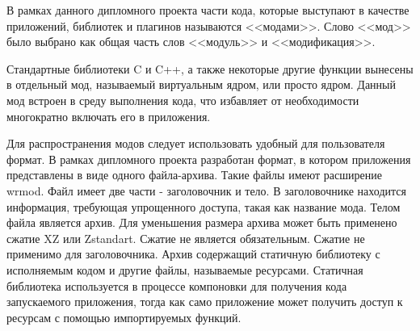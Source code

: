 В рамках данного дипломного проекта части кода, которые выступают в качестве приложений, библиотек и плагинов называются <<модами>>. 
Слово <<мод>> было выбрано как общая часть слов <<модуль>> и <<модификация>>.

Стандартные библиотеки C и C++, а также некоторые другие функции вынесены в отдельный мод, называемый виртуальным ядром, или просто ядром.
Данный мод встроен в среду выполнения кода, что избавляет от необходимости многократно включать его в приложения.

Для распространения модов следует использовать удобный для пользователя формат.
В рамках дипломного проекта разработан формат, в котором приложения представлены в виде одного файла-архива.
Такие файлы имеют расширение wrmod.
Файл имеет две части - заголовочник и тело.
В заголовочнике находится информация, требующая упрощенного доступа, такая как название мода.
Телом файла является архив.
Для уменьшения размера архива может быть применено сжатие XZ или Zstandart.
Сжатие не является обязательным.
Сжатие не применимо для заголовочника.
Архив содержащий статичную библиотеку с исполняемым кодом и другие файлы, называемые ресурсами.
Статичная библиотека используется в процессе компоновки для получения кода запускаемого приложения, тогда как само приложение может получить доступ к ресурсам с помощью импортируемых функций.
